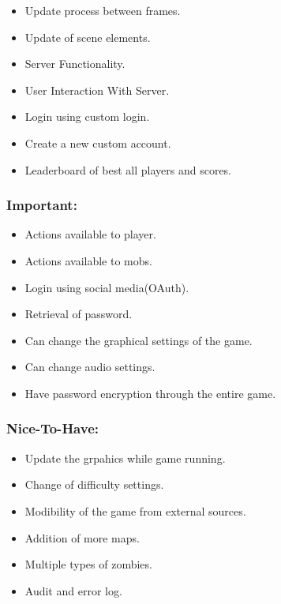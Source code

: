 \documentclass[letterpaper]{article}
\begin{document}
					\begin{itemize}
						\item Update process between frames.
						\item Update of scene elements.
						\item Server Functionality.
						\item User Interaction With Server.
						\item Login using custom login.
						\item Create a new custom account.	
						\item Leaderboard of best all players and scores.					
					\end{itemize}	
					
				\vspace{0.2in}
				\subsubsection*{Important:}
				\vspace{0.2in}
				
					\begin{itemize}
						\item Actions available to player.
						\item Actions available to mobs.
						\item Login using social media(OAuth).
						\item Retrieval of password.
						\item Can change the graphical settings of the game.
						\item Can change audio settings.
						\item Have password encryption through the entire game.
					\end{itemize}
				
				\vspace{0.2in}
				\subsubsection*{Nice-To-Have:}
				\vspace{0.2in}
					\begin{itemize}
						\item Update the grpahics while game running.
						\item Change of difficulty settings.
						\item Modibility of the game from external sources.
						\item Addition of more maps.
						\item Multiple types of zombies.
						\item Audit and error log.
					\end{itemize}
					
\end{document}
